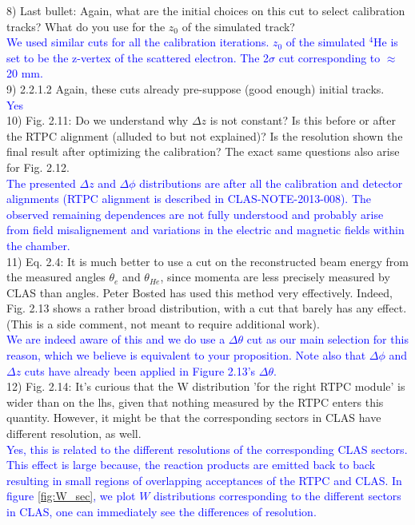 8) Last bullet: Again, what are the initial choices on this cut to select 
calibration tracks? What do you use for the $z_0$ of the simulated track?  \\
\textcolor{blue}{
   We used similar cuts for all the calibration iterations. $z_0$ of the 
simulated $^{4}$He is set to be the z-vertex of the scattered electron. The 
2$\sigma$ cut corresponding to $\approx$ 20 mm.  }\\

9) 2.2.1.2 Again, these cuts already pre-suppose (good enough) initial tracks.  \\
\textcolor{blue}{Yes}\\

 10) Fig. 2.11: Do we understand why $\Delta z$ is not constant? Is this before 
or after the RTPC alignment (alluded to but not explained)? Is the resolution 
shown the final result after optimizing the calibration? The exact same 
questions also arise for Fig. 2.12. \\
\textcolor{blue}{
  The presented $\Delta z$ and $\Delta\phi$ distributions are after all the 
calibration and detector alignments (RTPC alignment is described in CLAS-NOTE-2013-008).
The observed remaining dependences are not fully understood and probably arise
from field misalignement and variations in the electric and magnetic fields
within the chamber.} \\


11) Eq. 2.4: It is much better to use a cut on the reconstructed beam energy 
from the measured angles $\theta_e$ and $\theta_{He}$, since momenta are less 
precisely measured by CLAS than angles. Peter Bosted has used this method very 
effectively. Indeed, Fig. 2.13 shows a rather broad distribution, with a cut 
that barely has any effect. (This is a side comment, not meant to require 
additional work).\\
\textcolor{blue}{We are indeed aware of this and we do use a $\Delta \theta$ cut
as our main selection for this reason, which we believe is equivalent to your
proposition. Note also that $\Delta\phi$ and 
$\Delta z$ cuts have already been applied in Figure 2.13's $\Delta\theta$.}\\

12) Fig. 2.14: It's curious that the W distribution 'for the right RTPC module' 
is wider than on the lhs, given that nothing measured by the RTPC enters this 
quantity. However, it might be that the corresponding sectors in CLAS have 
different resolution, as well.\\
\textcolor{blue}{
Yes, this is related to the different resolutions of the corresponding CLAS sectors. 
This effect is large because, the reaction products are emitted back to back 
resulting in small regions of overlapping acceptances of the RTPC and CLAS.  
In figure \ref{fig:W_sec}, we plot $W$ distributions corresponding to the 
different sectors in CLAS, one can immediately see the differences of resolution.}\\

